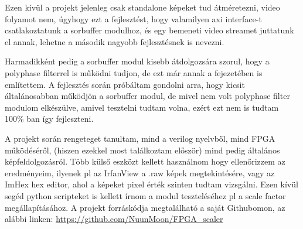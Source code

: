 Ezen kívül a projekt jelenleg csak standalone képeket tud átméretezni, video folyamot nem, úgyhogy ezt a fejlesztést, hogy valamilyen axi interface-t csatlakoztatunk a sorbuffer modulhoz, és egy bemeneti video streamet juttatunk el annak, lehetne a második nagyobb fejlesztésnek is nevezni.

Harmadikként pedig a sorbuffer modul kisebb átdolgozsára szorul, hogy a polyphase filterrel is működni tudjon, de ezt már annak a fejezetében is említettem. A fejlesztés során próbáltam gondolni arra, hogy kicsit általánosabban működjön a sorbuffer modul, de mivel nem volt polyphase filter modulom elkészülve, amivel tesztelni tudtam volna, ezért ezt nem is tudtam 100\% ban így fejleszteni.

A projekt során rengeteget tanultam, mind a verilog nyelvből, mind FPGA működéséről, (hiszen ezekkel most találkoztam először) mind pedig általános képfeldolgozásról. Több külső eszközt kellett használnom hogy ellenőrizzem az eredményeim, ilyenek pl az IrfanView a .raw képek megtekintésére, vagy az ImHex hex editor, ahol a képeket pixel érték szinten tudtam vizsgálni. Ezen kívül segéd python scripteket is kellett írnom a modul teszteléséhez pl a scale factor megállapításához. A projekt forráskódja megtalálható a saját Githubomon, az alábbi linken: \url{https://github.com/NuunMoon/FPGA_scaler}